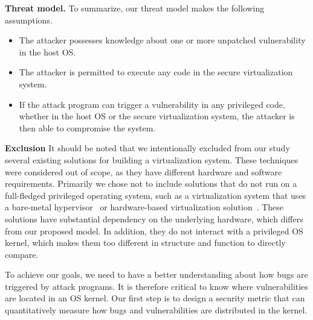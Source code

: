 \noindent\textbf{Threat model.}
To summarize, our threat model makes the following assumptions.

\begin{itemize}\setlength\itemsep{0em}

\item The attacker possesses knowledge about one or more unpatched vulnerability in the host OS.

\item The attacker is permitted to execute any code in the secure virtualization system.

\item If the attack program can trigger a vulnerability in any privileged code,
whether in the host OS or the secure virtualization system, the attacker is then able to
compromise the system.

\end{itemize}

\textbf{Exclusion}
It should be noted that we intentionally excluded from our study several existing
solutions for building a virtualization system. These techniques were considered
out of scope, as they have different hardware and software requirements.
Primarily we chose not to include solutions that do not run on a full-fledged
privileged operating system, such as a virtualization system that uses a
bare-metal hypervisor~\cite{Xen-03} or hardware-based virtualization
solution~\cite{IntelVT}.  These solutions
have substantial dependency on the
underlying hardware, which differs from our proposed model. In addition,
they do not interact with a privileged OS kernel, which makes them too different
in structure and function to directly compare.
 

To achieve our goals, we need to have a better understanding about how
bugs are triggered by attack programs. It is therefore critical to know where
vulnerabilities are located in an OS kernel. Our first step is to design
a security metric that can quantitatively measure how bugs and vulnerabilities
are distributed in the kernel.
